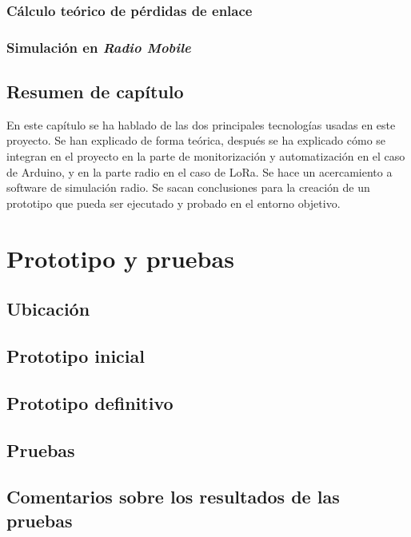 \documentclass[12pt]{article}
\begin{document}
	\subsubsection{Cálculo teórico de pérdidas de enlace}
	\subsubsection{Simulación en \textit{Radio Mobile}}
	
	\subsection[Resumen del capítulo]{Resumen de capítulo}
	
	En este capítulo se ha hablado de las dos principales tecnologías usadas en este proyecto. Se han explicado de forma teórica, después se ha explicado cómo se integran en el proyecto en la parte de monitorización y automatización en el caso de Arduino, y en la parte radio en el caso de LoRa. Se hace un acercamiento a software de simulación radio. Se sacan conclusiones para la creación de un prototipo que pueda ser ejecutado y probado en el entorno objetivo.
	\pagebreak
	
	
	\section[Prototipo y pruebas]{Prototipo y pruebas}
	
	\subsection[Ubicación]{Ubicación}
	\subsection[Prototipo inicial]{Prototipo inicial}
	\subsection[Prototipo definitivo]{Prototipo definitivo}
	\subsection[Pruebas]{Pruebas}
	\subsection[Comentarios sobre los resultados de las pruebas]{Comentarios sobre los resultados de las pruebas}
\end{document}

